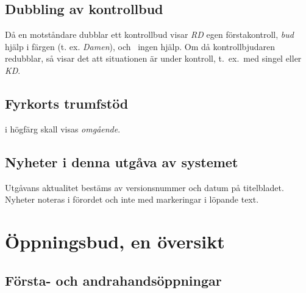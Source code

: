 

\subsection{Dubbling av kontrollbud}

D{\aa} en motst{\aa}ndare dubblar ett kontrollbud visar {\em RD} egen
f\"orstakontroll, {\em bud} hj\"alp i f\"argen (t. ex. {\em Damen}), och
\pass\ 
ingen hj\"alp. Om d{\aa} kontrollbjudaren redubblar, s{\aa} visar det att
situationen \"ar under kontroll, t.\ ex.\ med singel eller {\em KD}.

\subsection{Fyrkorts trumfst\"od}

 i h\"ogf\"arg skall visas {\em omg\aa{}ende}.

\subsection{Nyheter i denna utg{\aa}va av systemet}

Utg{\aa}vans aktualitet best\"ams av versionsnummer och datum p{\aa}
titelbladet. Nyheter noteras i förordet och inte med
markeringar i löpande text.

\newpage
\section{\"Oppningsbud, en \"oversikt}

\subsection{Första- och andrahandsöppningar}

